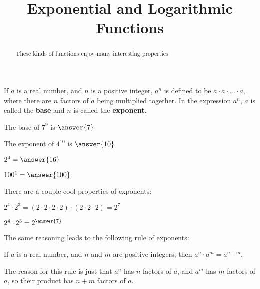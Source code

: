 \documentclass{ximera}
\title{Exponential and Logarithmic Functions}
\begin{document}
\begin{abstract}
	These kinds of functions enjoy many interesting properties
\end{abstract}

\maketitle

\begin{definition}
	If $a$ is a real number, and $n$ is a positive integer, $a^n$ is defined to be $a \cdot a \cdot ... \cdot a$, where there are $n$ factors of $a$ being multiplied together.  In the expression $a^n$, $a$ is called the \textbf{base} and $n$ is called the \textbf{exponent}.
\end{definition}

\begin{question}
	The base of $7^9$ is $\answer{7}$
\end{question}

\begin{question}
	The exponent of $4^{10}$ is $\answer{10}$
\end{question}

\begin{question}
	$2^4 = \answer{16}$
\end{question}

\begin{question}
	$100^1= \answer{100}$
\end{question}

There are a couple cool properties of exponents:

\begin{question}
	\begin{hint}
		$2^4 \cdot 2^3 = (2 \cdot 2\cdot 2 \cdot 2) \cdot  (2 \cdot 2\cdot 2) = 2^7 $
	\end{hint}

	$2^4 \cdot 2^3 = 2^{\answer{7}}$
\end{question}

The same reasoning leads to the following rule of exponents:

\begin{theorem}
	If $a$ is a real number, and $n$ and $m$ are positive integers, then $a^n \cdot a^m = a^{n+m}$.
\end{theorem}

The reason for this rule is just that $a^n$ has $n$ factors of $a$, and $a^m$ has $m$ factors of $a$, so their product has $n+m$ factors of $a$.
\end{document}
